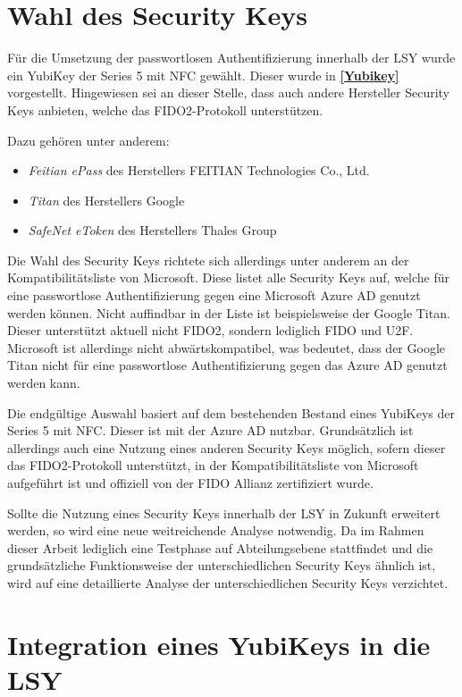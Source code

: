\section{Wahl des Security Keys} \label{secwahl}
Für die Umsetzung der passwortlosen Authentifizierung innerhalb der \ac{LSY} wurde ein YubiKey der Series 5 mit NFC gewählt. Dieser wurde in \textbf{\ref{Yubikey}} vorgestellt. Hingewiesen sei an dieser Stelle, dass auch andere Hersteller Security Keys anbieten, welche das FIDO2-Protokoll unterstützen. 

Dazu gehören unter anderem:
\begin{itemize}
    \item \textit{Feitian ePass} des Herstellers FEITIAN Technologies Co., Ltd.
    \item \textit{Titan} des Herstellers Google
    \item \textit{SafeNet eToken} des Herstellers Thales Group
\end{itemize}

Die Wahl des Security Keys richtete sich allerdings unter anderem an der Kompatibilitätsliste \cite{compWin} von Microsoft. Diese listet alle Security Keys auf, welche für eine passwortlose Authentifizierung gegen eine Microsoft Azure \ac{AD} genutzt werden können. Nicht auffindbar in der Liste ist beispielsweise der Google Titan. Dieser unterstützt aktuell nicht FIDO2, sondern lediglich FIDO und \ac{U2F}. Microsoft ist allerdings nicht abwärtskompatibel, was bedeutet, dass der Google Titan nicht für eine passwortlose Authentifizierung gegen das Azure \ac{AD} genutzt werden kann.

Die endgültige Auswahl basiert auf dem bestehenden Bestand eines YubiKeys der Series 5 mit NFC. Dieser ist mit der Azure \ac{AD} nutzbar. Grundsätzlich ist allerdings auch eine Nutzung eines anderen Security Keys möglich, sofern dieser das \ac{FIDO}2-Protokoll unterstützt, in der Kompatibilitätsliste von Microsoft aufgeführt ist und offiziell von der \ac{FIDO} Allianz zertifiziert wurde.

Sollte die Nutzung eines Security Keys innerhalb der \ac{LSY} in Zukunft erweitert werden, so wird eine neue weitreichende Analyse notwendig. Da im Rahmen dieser Arbeit lediglich eine Testphase auf Abteilungsebene stattfindet und die grundsätzliche Funktionsweise der unterschiedlichen Security Keys ähnlich ist, wird auf eine detaillierte Analyse der unterschiedlichen Security Keys verzichtet.

\section{Integration eines YubiKeys in die LSY}

